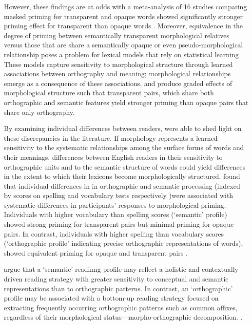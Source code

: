 \documentclass[review]{elsarticle}
\begin{document}
However, these findings are at odds with a  meta-analysis of 16 studies comparing masked priming for transparent and opaque words showed significantly stronger priming effect for transparent than opaque words \citep{feldmanEarlyMorphologicalProcessing2009}. Moreover, equivalence in the degree of priming between semantically transparent morphological relatives versus those that are share a semantically opaque or even pseudo-morphological relationship poses a problem for lexical models that rely on statistical learning \citep{plautAreNonsemanticMorphological2000, baayenAmorphousModelMorphological2011}. These models capture sensitivity to morphological structure through learned associations between orthography and meaning; morphological relationships emerge as a consequence of these associations, and  produce graded effects of morphological structure such that transparent pairs, which share both orthographic and semantic features yield stronger priming than opaque pairs that share only orthography.    

By examining individual differences between readers, {\renewcommand\&{and}\citet{andrewsMorphologicalPrimingStronger2013}}  were able to shed light on these discrepancies in the literature.  If morphology represents a learned sensitivity to the systematic relationships among the surface forms of words and their meanings, differences between English readers in their sensitivity to orthographic units and to the semantic structure of words could  yield differences in the extent to which their lexicons become morphologically structured.  {\renewcommand\&{and}\citet{andrewsMorphologicalPrimingStronger2013}} found that individual differences in in orthographic and semantic processing (indexed by scores on spelling and vocabulary tests respectively )were associated with systematic differences in participants' responses to morphological priming.  Individuals with higher vocabulary than spelling scores (`semantic' profile) showed strong priming for transparent pairs but minimal priming for opaque pairs. In contrast, individuals with higher spelling than vocabulary scores (‘orthographic profile’ indicating precise orthographic representations of words), showed equivalent priming for opaque and transparent pairs \citep{andrewsMorphologicalPrimingStronger2013}.

{\renewcommand\&{and}\citet{andrewsMorphologicalPrimingStronger2013}} argue that a `semantic' readinng profile may reflect a holistic and contextually-driven reading strategy with greater sensitivity to conceptual and semantic representations than to orthographic patterns.  In contrast, an `orthographic' profile may be associated with a bottom-up reading strategy focused on extracting  frequently occurring orthographic patterns such as common affixes, regardless of their morphological status—morpho-orthographic decomposition.  . 
 
\end{document}
